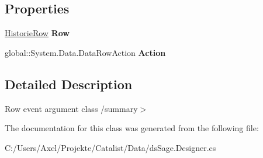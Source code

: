 \subsection*{Properties}
\begin{DoxyCompactItemize}
\item 
\hyperlink{class_products_1_1_data_1_1ds_sage_1_1_historie_row}{Historie\+Row} {\bfseries Row}\hypertarget{class_products_1_1_data_1_1ds_sage_1_1_historie_row_change_event_a2928e53fee5f19f0d7acaa54c5e6a60d}{}\label{class_products_1_1_data_1_1ds_sage_1_1_historie_row_change_event_a2928e53fee5f19f0d7acaa54c5e6a60d}

\item 
global\+::\+System.\+Data.\+Data\+Row\+Action {\bfseries Action}\hypertarget{class_products_1_1_data_1_1ds_sage_1_1_historie_row_change_event_aa891c091055495217f893953b18b6cf0}{}\label{class_products_1_1_data_1_1ds_sage_1_1_historie_row_change_event_aa891c091055495217f893953b18b6cf0}

\end{DoxyCompactItemize}


\subsection{Detailed Description}
Row event argument class /summary$>$ 

The documentation for this class was generated from the following file\+:\begin{DoxyCompactItemize}
\item 
C\+:/\+Users/\+Axel/\+Projekte/\+Catalist/\+Data/ds\+Sage.\+Designer.\+cs\end{DoxyCompactItemize}
